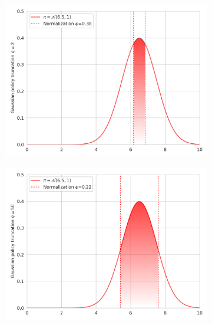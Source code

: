 \documentclass{article}
\begin{document}
\begin{figure}[t]
    \centering
    \begin{subfigure}[b]{0.245\textwidth}
        \includegraphics[width=\textwidth]{img/q2_Gaussian_sparsemax.png}
    \end{subfigure}
    \begin{subfigure}[b]{0.245\textwidth}
        \includegraphics[width=\textwidth]{img/q50_scaled_Gaussian_sparsemax.png}
    \end{subfigure}
    \begin{subfigure}[b]{0.245\textwidth}

\end{subfigure}
\end{figure}
\end{document}
